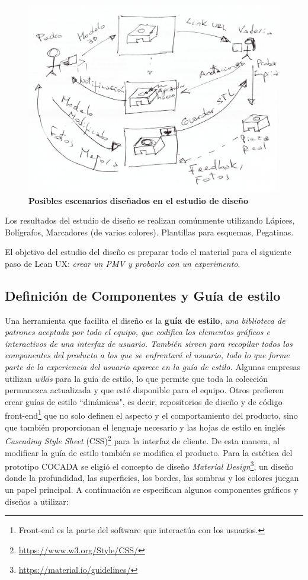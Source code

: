 \begin{figure}[h]
\includegraphics[width=14cm]{Img/UX/ed2.jpg}
\centering
\caption{\textbf{ \footnotesize{Posibles escenarios diseñados en el estudio de diseño}}}
\end{figure}

Los resultados del estudio de diseño se realizan comúnmente utilizando Lápices, Bolígrafos, Marcadores (de varios colores). Plantillas para esquemas, Pegatinas.

El objetivo del estudio del diseño es preparar todo el material para el siguiente paso de Lean UX: \textit{crear un PMV y probarlo con un experimento}.


\clearpage
\subsection{Definición de Componentes y Guía de estilo}
Una herramienta que facilita el diseño es la \textbf{guía de estilo}, \textit{una biblioteca de patrones aceptada por todo  el equipo, que codifica los elementos gráficos e interactivos de una interfaz de usuario. También sirven para recopilar todos los componentes del producto a los que se enfrentará el usuario, todo lo que forme parte de la experiencia del usuario aparece en la guía de estilo.} Algunas empresas utilizan \textit{wikis} para la guía de estilo, lo que permite que toda la colección permanezca actualizada y que esté disponible para el equipo. Otros prefieren crear guías de estilo ``dinámicas", es decir, repositorios de diseño y de código front-end\footnote{Front-end es la parte del software que interactúa con los usuarios.} que no solo definen el aspecto y el comportamiento del producto, sino que también proporcionan el lenguaje necesario y las hojas de estilo en inglés \textit{Cascading Style Sheet} (CSS)\footnote{\url{https://www.w3.org/Style/CSS/}} para la interfaz de cliente. De esta manera, al modificar la guía de estilo también se modifica el producto.
Para la estética del prototipo COCADA se eligió el concepto de diseño \textit{Material Design}\footnote{\url{https://material.io/guidelines/}}, un diseño donde la profundidad, las superficies, los bordes, las sombras y los colores juegan un papel principal. A continuación se especifican algunos componentes gráficos y diseños a utilizar:


